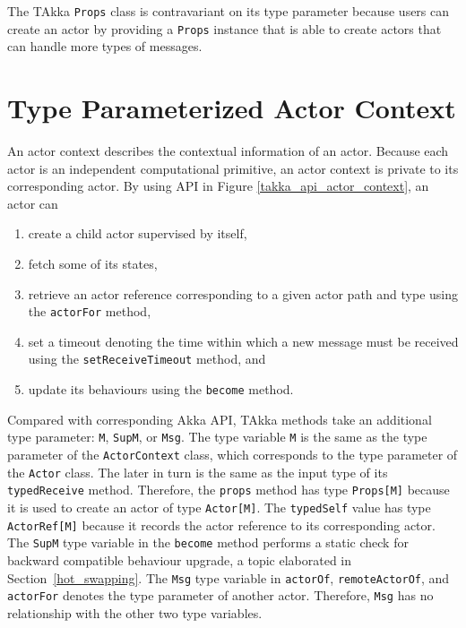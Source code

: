 The TAkka {\tt Props} class is contravariant on its type parameter because 
users can create an actor by providing a {\tt Props} instance that is able to 
create actors that can handle more types of messages.


\section{Type Parameterized Actor Context}
\label{takka_actor_context}

An actor context describes the contextual information of an actor. Because each 
actor is an independent computational primitive, an actor context is private to 
its corresponding actor.  By using API in Figure 
\ref{takka_api_actor_context}, an actor can
\begin{enumerate}
\item create a child actor supervised by itself,
\item fetch some of its states,
\item retrieve an actor reference 
corresponding to a given actor path and type using the {\tt actorFor} method,
\item set a timeout denoting the time within which
a new message must be received using the {\tt setReceiveTimeout} method, and
\item update its behaviours using the {\tt become} method.  
\end{enumerate}

Compared with corresponding Akka API, TAkka methods take an additional type 
parameter: {\tt M}, {\tt SupM}, or {\tt Msg}.  The type variable {\tt M} is
the same as the type parameter of the {\tt ActorContext} class, which corresponds
to the type parameter of the {\tt Actor} class.  The later in turn is the same
as the input type of its {\tt typedReceive} method.  Therefore, the {\tt props}
method has type {\tt Props[M]} because it is used to create an actor of type {\tt Actor[M]}.
The {\tt typedSelf} value has type {\tt ActorRef[M]} because it records the 
actor reference to its corresponding actor.  The {\tt SupM} type variable in the
{\tt become} method performs a static check for backward compatible behaviour
upgrade, a topic elaborated in Section~\ref{hot_swapping}.  
The {\tt Msg} type variable in {\tt actorOf}, {\tt remoteActorOf}, and {\tt actorFor}
denotes the type parameter of another actor.  Therefore, {\tt Msg} has no
relationship with the other two type variables.



